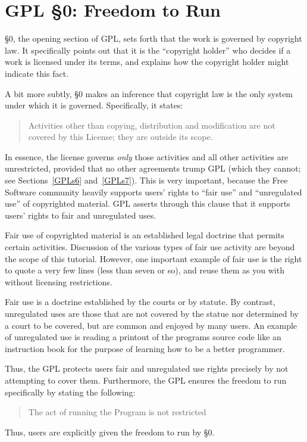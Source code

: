 \documentclass[12pt]{report}
\begin{document}
\section{GPL \S 0: Freedom to Run}

\S 0, the opening section of GPL, sets forth that the work is governed by
copyright law.  It specifically points out that it is the ``copyright
holder'' who decides if a work is licensed under its terms, and explains
how the copyright holder might indicate this fact.

A bit more subtly, \S 0 makes an inference that copyright law is the only
system under which it is governed.  Specifically, it states:
\begin{quote}
Activities other than copying, distribution and modification are not
covered by this License; they are outside its scope.
\end{quote}
In essence, the license governs \emph{only} those activities and all other
activities are unrestricted, provided that no other agreements trump GPL
(which they cannot; see Sections~\ref{GPLs6} and~\ref{GPLs7}).  This is
very important, because the Free Software community heavily supports
users' rights to ``fair use'' and ``unregulated use'' of copyrighted
material.  GPL asserts through this clause that it supports users' rights
to fair and unregulated uses.

Fair use of copyrighted material is an established legal doctrine that
permits certain activities.  Discussion of the various types of fair use
activity are beyond the scope of this tutorial.  However, one important
example of fair use is the right to quote a very few lines (less than
seven or so), and reuse them as you with without licensing restrictions.

Fair use is a doctrine established by the courts or by statute.  By
contrast, unregulated uses are those that are not covered by the statue
nor determined by a court to be covered, but are common and enjoyed by
many users.  An example of unregulated use is reading a printout of the
programs source code like an instruction book for the purpose of learning
how to be a better programmer.

\medskip

Thus, the GPL protects users fair and unregulated use rights precisely by
not attempting to cover them.  Furthermore, the GPL ensures the freedom
to run specifically by stating the following:
\begin{quote}
The act of running the Program is not restricted
\end{quote}
Thus, users are explicitly given the freedom to run by \S 0.
\end{document}

